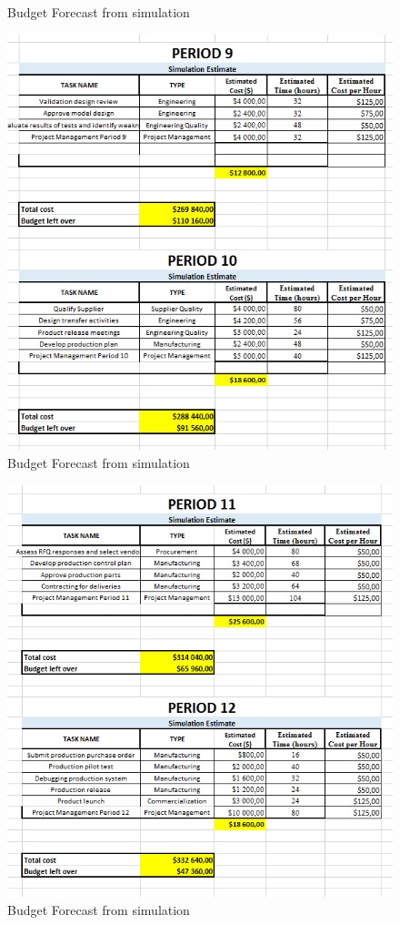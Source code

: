 \begin{appendices}
\begin{figure}[H]
\caption{Budget Forecast from simulation}
\end{figure}
\begin{figure}[H]
\includegraphics[scale=1]{budget_forecast_sim_910.PNG}
\caption{Budget Forecast from simulation}
\end{figure}
\begin{figure}[H]
\includegraphics[scale=1]{budget_forecast_sim_1112.PNG}
\caption{Budget Forecast from simulation}
\end{figure}



\end{appendices}
